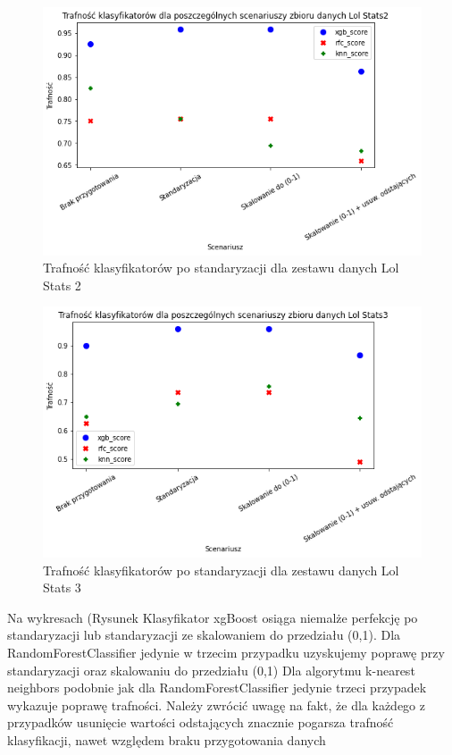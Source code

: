\documentclass{book}
\begin{document}
\begin{figure}[H]
\centerline{\includegraphics[scale=0.5]{Lol_Stats_2_Standaryzacja}}
\centering
\caption{Trafność klasyfikatorów po standaryzacji dla zestawu danych Lol Stats 2}
\end{figure}

\begin{figure}[H]
\centerline{\includegraphics[scale=0.5]{Lol_Stats_3_Standaryzacja}}
\centering
\caption{Trafność klasyfikatorów po standaryzacji dla zestawu danych Lol Stats 3}
\end{figure}

Na wykresach (Rysunek Klasyfikator xgBoost osiąga niemalże perfekcję po 
standaryzacji lub standaryzacji ze skalowaniem do przedziału (0,1). 
Dla RandomForestClassifier jedynie w trzecim przypadku uzyskujemy poprawę przy 
standaryzacji oraz skalowaniu do przedziału (0,1) 
Dla algorytmu k-nearest neighbors podobnie jak dla RandomForestClassifier jedynie 
trzeci przypadek wykazuje poprawę trafności.
Należy zwrócić uwagę na fakt, że dla każdego z przypadków usunięcie wartości 
odstających znacznie pogarsza trafność klasyfikacji, 
nawet względem braku przygotowania danych
\end{document}
